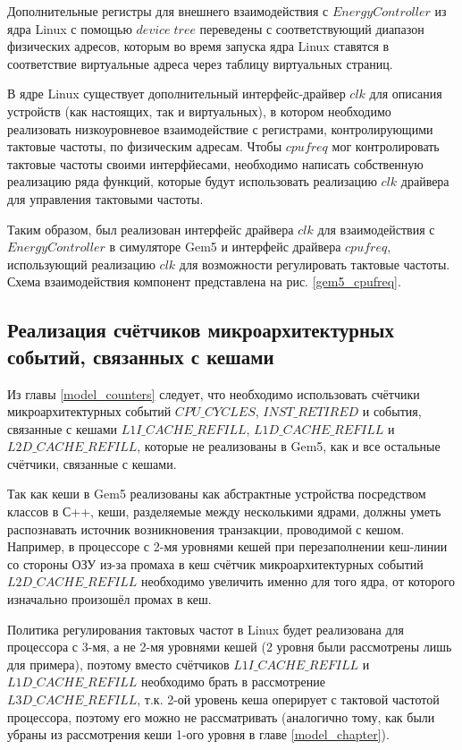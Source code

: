     Дополнительные регистры для внешнего взаимодействия с $EnergyController$ из ядра Linux с помощью
    $device \; tree$ переведены с соответствующий диапазон физических адресов, которым во время запуска ядра
    Linux ставятся в соответствие виртуальные адреса через таблицу виртуальных страниц.

    В ядре Linux существует дополнительный интерфейс-драйвер $clk$ для описания устройств (как
    настоящих, так и виртуальных), в котором необходимо реализовать низкоуровневое
    взаимодействие с регистрами, контролирующими тактовые частоты, по физическим адресам.
    Чтобы $cpufreq$ мог контролировать тактовые частоты своими интерфйесами, необходимо написать собственную
    реализацию ряда функций, которые будут использовать реализацию $clk$ драйвера для управления
    тактовыми частоты.

    Таким образом, был реализован интерфейс драйвера $clk$ для взаимодействия с $EnergyController$
    в симуляторе Gem5 и интерфейс драйвера $cpufreq$, использующий реализацию $clk$ для возможности
    регулировать тактовые частоты. Схема взаимодействия компонент представлена на рис. \ref{gem5_cpufreq}.

\subsection{Реализация счётчиков микроархитектурных событий, связанных с кешами} \label{counters_impl}

    Из главы \ref{model_counters} следует, что необходимо использовать счётчики микроархитектурных
    событий $CPU\_CYCLES$, $INST\_RETIRED$ и события, связанные с кешами $L1I\_CACHE\_REFILL$,
    $L1D\_CACHE\_REFILL$ и $L2D\_CACHE\_REFILL$, которые не реализованы в Gem5, как и все остальные счётчики,
    связанные с кешами.

    Так как кеши в Gem5 реализованы как абстрактные устройства посредством классов в С++, кеши,
    разделяемые между несколькими ядрами, должны уметь распознавать источник возникновения транзакции,
    проводимой с кешом. Например, в процессоре с 2-мя уровнями кешей при перезаполнении кеш-линии со
    стороны ОЗУ из-за промаха в кеш счётчик микроархитектурных событий $L2D\_CACHE\_REFILL$
    необходимо увеличить именно для того ядра, от которого изначально произошёл промах в кеш.

    Политика регулирования тактовых частот в Linux будет реализована для процессора с 3-мя,
    а не 2-мя уровнями кешей (2 уровня были рассмотрены лишь для примера), поэтому вместо счётчиков
    $L1I\_CACHE\_REFILL$ и $L1D\_CACHE\_REFILL$ необходимо брать в рассмотрение $L3D\_CACHE\_REFILL$,
    т.к. 2-ой уровень кеша оперирует с тактовой частотой процессора, поэтому его можно не рассматривать
    (аналогично тому, как были убраны из рассмотрения кеши 1-ого уровня в главе \ref{model_chapter}).

